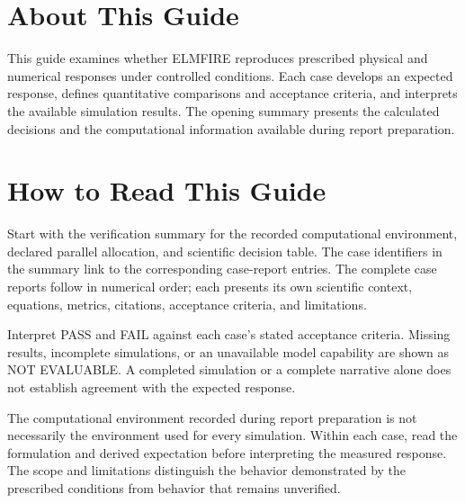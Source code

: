 \documentclass[12pt]{article}
\begin{document}
\newcommand{\GuideTitle}{ELMFIRE Verification Guide}



\section*{About This Guide}
{}
This guide examines whether ELMFIRE reproduces prescribed physical and numerical
responses under controlled conditions. Each case develops an expected response,
defines quantitative comparisons and acceptance criteria, and interprets the
available simulation results. The opening summary presents the calculated
decisions and the computational information available during report preparation.

\clearpage
\tableofcontents
\clearpage

\section{How to Read This Guide}

Start with the verification summary for the recorded computational environment,
declared parallel allocation, and scientific decision table. The
case identifiers in the summary link to the corresponding case-report entries.
The complete case reports follow in numerical order; each presents its own scientific
context, equations, metrics, citations, acceptance criteria, and limitations.

Interpret PASS and FAIL against each case's stated acceptance criteria. Missing
results, incomplete simulations, or an unavailable model capability are shown
as NOT EVALUABLE. A completed simulation or a complete narrative alone does not
establish agreement with the expected response.

The computational environment recorded during report preparation is not
necessarily the environment used for every simulation. Within each case, read
the formulation and derived expectation before interpreting the measured
response. The scope and limitations distinguish the behavior demonstrated by
the prescribed conditions from behavior that remains unverified.




\end{document}
